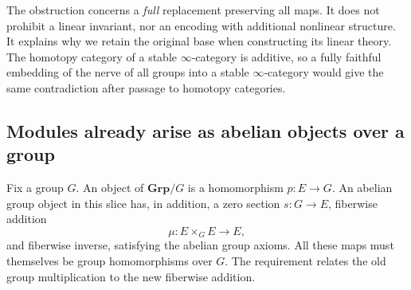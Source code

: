 The obstruction concerns a \emph{full} replacement preserving all maps.
It does not prohibit a linear invariant, nor an encoding with additional
nonlinear structure.  It explains why we retain the original base when
constructing its linear theory.  The homotopy category of a stable
$\infty$-category is additive, so a fully faithful embedding of the nerve
of all groups into a stable $\infty$-category would give the same
contradiction after passage to homotopy categories.

\subsection{Modules already arise as abelian objects over a group}

Fix a group $G$.  An object of $\mathbf{Grp}/G$ is a homomorphism
$p:E\to G$.  An abelian group object in this slice has, in addition,
a zero section $s:G\to E$, fiberwise addition
\[
 \mu:E\times_G E\longrightarrow E,
\]
and fiberwise inverse, satisfying the abelian group axioms.  All these
maps must themselves be group homomorphisms over $G$.  The requirement
relates the old group multiplication to the new fiberwise addition.

